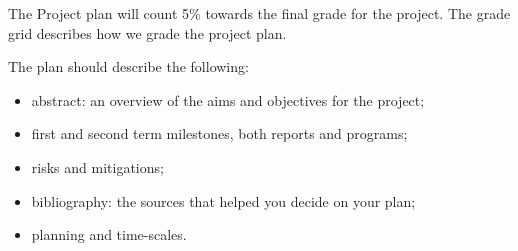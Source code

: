 \documentclass[11pt]{article}
\newcommand{\planweight}{5\% }
\begin{document}
The Project plan will count \planweight towards the final grade for the project.
The grade grid describes how we grade the project plan.

The plan should describe the following:
\begin{itemize}
\item abstract: an overview of the aims and objectives for the project;
\item first and second term milestones, both reports and programs;
\item risks and mitigations;
\item bibliography: the sources that helped you decide on your plan;
\item planning and time-scales.
\end{itemize}

\vspace*{10mm}
\end{document}

